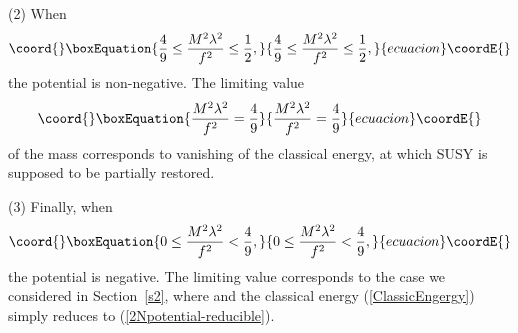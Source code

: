 \documentclass[a4paper,12pt]{article}
\begin{document}
{(2) When
\begin{equation}\coord{}\boxEquation{
\frac{4}{9}\leq\frac{M^{2}\lambda^{2}}{f^{2}}\leq\frac{1}{2},
}{
\frac{4}{9}\leq\frac{M^{2}\lambda^{2}}{f^{2}}\leq\frac{1}{2},
}{ecuacion}\coordE{}\end{equation}
the potential is non-negative. The limiting value 
\begin{equation}\coord{}\boxEquation{
\frac{M^{2}\lambda^{2}}{f^{2}}=\frac{4}{9}
\label{SUSY}
}{
\frac{M^{2}\lambda^{2}}{f^{2}}=\frac{4}{9}
}{ecuacion}\coordE{}\end{equation}
of the mass corresponds to vanishing of the classical energy, at which SUSY is supposed to be partially restored.

(3) Finally, when
\begin{equation}\coord{}\boxEquation{
0\leq \frac{M^{2}\lambda^{2}}{f^{2}} < \frac{4}{9},
}{
0\leq \frac{M^{2}\lambda^{2}}{f^{2}} < \frac{4}{9},
}{ecuacion}\coordE{}\end{equation}
the potential is negative. The limiting value \coordHE{} corresponds to the case we considered in Section~\ref{s2}, where \coordHE{} and the classical energy (\ref{ClassicEngergy}) simply reduces to (\ref{2Npotential-reducible}).

}
\end{document}
